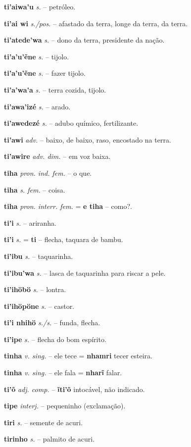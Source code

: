 \textbf{ti'aiwa'u} \textit{s.} -- petróleo.

\textbf{ti'ai wi} \textit{s./pos.} -- afastado da terra, longe da terra, da terra.

\textbf{ti'atede'wa} \textit{s.} -- dono da terra, presidente da nação.

\textbf{ti'a'u'ẽne} \textit{s.} -- tijolo.

\textbf{ti'a'u'ẽne} \textit{s.} -- fazer tijolo.

\textbf{ti'a'wa'a} \textit{s.} -- terra cozida, tijolo.

\textbf{ti'awa'izé} \textit{s.} -- arado.

\textbf{ti'awedezé} \textit{s.} -- adubo químico, fertilizante.

\textbf{ti'awi} \textit{adv.} -- baixo, de baixo, raso, encostado na terra.

\textbf{ti'awire} \textit{adv. dim.} -- em voz baixa.

\textbf{tiha} \textit{pron. ind. fem.} -- o que.

\textbf{tiha} \textit{s. fem.} -- coisa.

\textbf{tiha} \textit{pron. interr. fem.} = \textbf{e tiha} -- como?.

\textbf{ti'i} \textit{s.} -- ariranha.

\textbf{ti'i} \textit{s.} = \textbf{ti} -- flecha, taquara de bambu.

\textbf{ti'ibu} \textit{s.} -- taquarinha.

\textbf{ti'ibu'wa} \textit{s.} -- lasca de taquarinha para riscar a pele.

\textbf{ti'ihöbö} \textit{s.} -- lontra.

\textbf{ti'ihöpöne} \textit{s.} -- castor.

\textbf{ti'i nhihö} \textit{s./s.} -- funda, flecha.

\textbf{ti'ipe} \textit{s.} -- flecha do bom espírito.

\textbf{tinha} \textit{v. sing.} -- ele tece = \textbf{nhamri} tecer esteira.

\textbf{tinha} \textit{v. sing.} -- ele fala = \textbf{nharĩ} falar.

\textbf{ti'õ} \textit{adj. comp.} -- \textbf{ĩti'õ} intocável, não indicado.

\textbf{tipe} \textit{interj.} -- pequeninho (exclamação).

\textbf{tiri} \textit{s.} -- semente de acuri.

\textbf{tirinho} \textit{s.} -- palmito de acuri.


